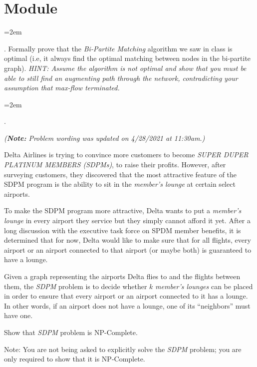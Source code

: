 \documentclass[12pt]{article}
\def\homework{Module}
\newcounter{quesnum}
\newcommand{\question}[2][??]{
\begin{list}{\labelitemi}{\leftmargin=2em}
\item [\arabic{quesnum}.] {#2}
\end{list}
\addtocounter{quesnum}{1}
}
\begin{document}
\section*{\homework}




\question[1]{
Formally prove that the \emph{Bi-Partite Matching} algorithm we saw in class is optimal (i.e, it always find the optimal matching between nodes in the bi-partite graph). \emph{HINT: Assume the algorithm is not optimal and show that you must be able to still find an augmenting path through the network, contradicting your assumption that max-flow terminated.}
}





\question[3]{
{\em ({\bf Note:} Problem wording was updated on 4/28/2021 at 11:30am.)}

Delta Airlines is trying to convince more customers to become \emph{SUPER DUPER PLATINUM MEMBERS (SDPMs)}, to raise their profits. However, after surveying customers, they discovered that the most attractive feature of the SDPM program is the ability to sit in the \emph{member's lounge} at certain select airports.

To make the SDPM program more attractive, Delta wants to put a \emph{member's lounge} in every airport they service but they simply cannot afford it yet. After a long discussion with the executive task force on SPDM member benefits, it is determined that for now, Delta would like to make sure that for all flights, every airport or an airport connected to that airport (or maybe both) is guaranteed to have a lounge.

Given a graph representing the airports Delta flies to and the flights between them, the \emph{SDPM} problem is to decide whether $k$ \emph{member's lounges} can be placed in order to ensure that every airport or an airport connected to it has a lounge. In other words, if an airport does not have a lounge, one of its ``neighbors'' must have one. 

Show that \emph{SDPM} problem is NP-Complete.

Note: You are not being asked to explicitly solve the \emph{SDPM} problem; you are only required to show that it is NP-Complete.
}

\end{document}
